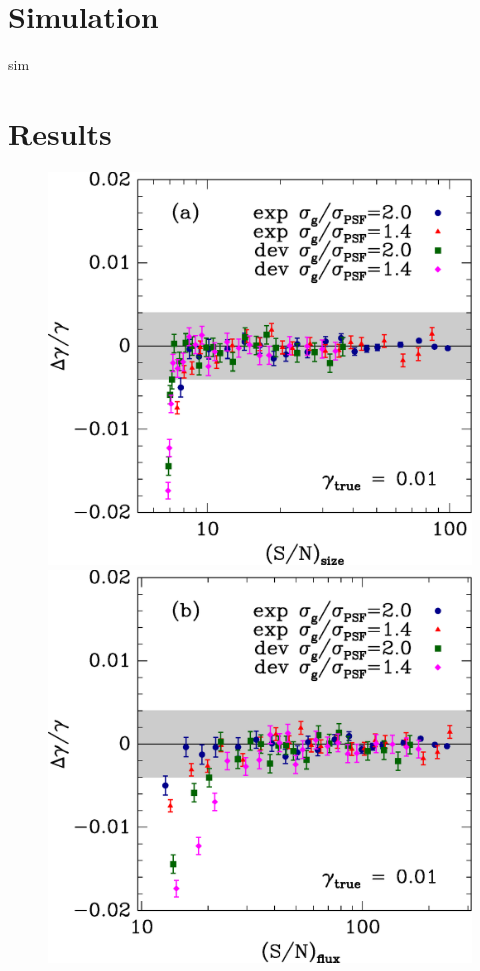 \documentclass[12pt,preprint]{aastex}
\begin{document}
\section{Simulation} \label{sec:sim}

sim

\section{Results} \label{sec:results}

\begin{figure}[p] \centering
 \centering 
 \includegraphics[scale=0.45]{figures/cbafit-geg-T-s2n.eps}
 \includegraphics[scale=0.45]{figures/cbafit-geg-flux-s2n.eps}


\end{figure}
\end{document}
